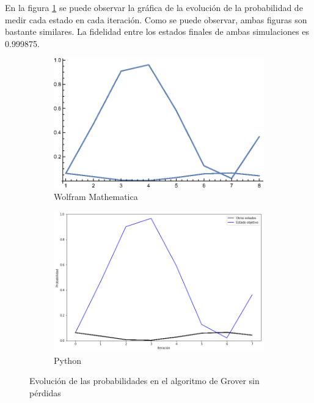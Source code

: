 En la figura \ref{fig:groverlosslesscomp} se puede observar la gráfica de la evolución de la probabilidad de medir cada estado en cada iteración. Como se puede observar, ambas figuras son bastante similares. La fidelidad entre los estados finales de ambas simulaciones es 0.999875.

\begin{figure}[H]
    \centering
    \begin{subfigure}[m]{0.49\textwidth}
        \centering
        \includegraphics[width=0.9\linewidth]{img/Grover-2_gr1.eps}
        \caption{Wolfram Mathematica}
    \end{subfigure}
    \begin{subfigure}[m]{0.49\textwidth}
        \centering
        \includegraphics[width=0.9\linewidth]{img/groveralllossless.png}
        \caption{Python}
    \end{subfigure}
    \caption[Evolución de las probabilidades en el algoritmo de Grover sin pérdidas]{Evolución de las probabilidades en el algoritmo de Grover sin pérdidas}
    \label{fig:groverlosslesscomp}
\end{figure}

